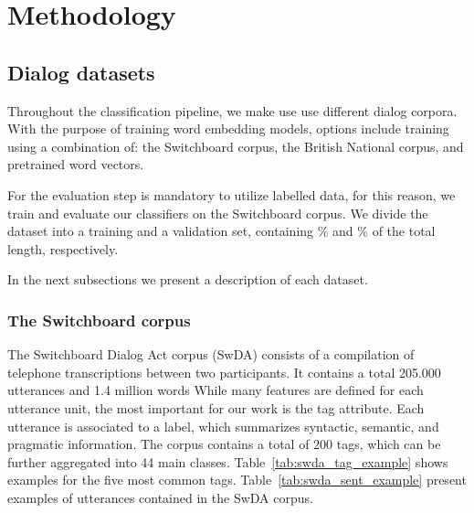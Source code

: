 \section{Methodology}\label{sec:method}
%



\subsection{Dialog datasets}
Throughout the classification pipeline, we make use use different dialog corpora. With the purpose of training word embedding models, options include training using a combination of: the Switchboard corpus, the British National corpus, and pretrained word vectors.

For the evaluation step is mandatory to utilize labelled data, for this reason, we train and evaluate our classifiers on the Switchboard corpus. We divide the dataset into a training and a validation set, containing $\%$ and $\%$ of the total length, respectively. 

In the next subsections we present a description of each dataset.

\subsubsection*{The Switchboard corpus}
The Switchboard Dialog Act corpus (SwDA) consists of a compilation of telephone transcriptions between two participants. It contains a total 205.000 utterances and 1.4 million words
While many features are defined for each utterance unit, the most important for our work is the tag attribute. Each utterance is associated to a label, which summarizes syntactic, semantic, and pragmatic information. The corpus contains a total of 200 tags, which can be further aggregated into 44 main classes. Table~\ref{tab:swda_tag_example} shows examples for the five most common tags. Table~\ref{tab:swda_sent_example} present examples of utterances contained in the SwDA corpus.

